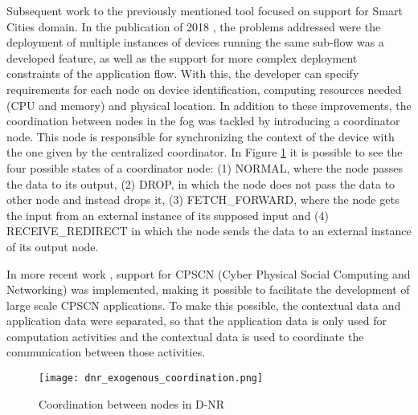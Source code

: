 \par Subsequent work to the previously mentioned tool focused on support for Smart Cities domain. In the publication of 2018 \cite{fog_at_the_edge}, the problems addressed were the deployment of multiple instances of devices running the same sub-flow was a developed feature, as well as the support for more complex deployment constraints of the application flow. With this, the developer can specify requirements for each node on device identification, computing resources needed (CPU and memory) and physical location. In addition to these improvements, the coordination between nodes in the fog was tackled by introducing a coordinator node. This node is responsible for synchronizing the context of the device with the one given by the centralized coordinator. In Figure \ref{fig:coordination_dnr} it is possible to see the four possible states of a coordinator node: (1) NORMAL, where the node passes the data to its output, (2) DROP, in which the node does not pass the data to other node and instead drops it, (3) FETCH\_FORWARD, where the node gets the input from an external instance of its supposed input and (4) RECEIVE\_REDIRECT in which the node sends the data to an external instance of its output node.
\par In more recent work \cite{exogenous_coordination}, support for CPSCN (Cyber Physical Social Computing and Networking) was implemented, making it possible to facilitate the development of large scale CPSCN applications. To make this possible, the contextual data and application data were separated, so that the application data is only used for computation activities and the contextual data is used to coordinate the communication between those activities.

\begin{figure}[h]
\caption{Coordination between nodes in D-NR \cite{fog_at_the_edge}}
\label{fig:coordination_dnr}
\centering
\texttt{[image: dnr\_exogenous\_coordination.png]}
\end{figure}

